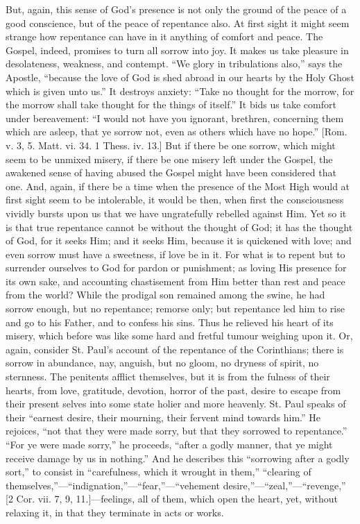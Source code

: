 But, again, this sense of God's presence is not only the ground of
the peace of a good conscience, but of the peace of repentance also.
At first sight it might seem strange how repentance can have in it
anything of comfort and peace. The Gospel, indeed, promises to turn
all sorrow into joy. It makes us take pleasure in desolateness,
weakness, and contempt. ``We glory in tribulations also,''
says the Apostle, ``because the love of God is shed abroad in our
hearts by the Holy Ghost which is given unto us.'' It destroys
anxiety: ``Take no thought for the morrow, for the morrow shall
take thought for the things of itself.'' It bids us take comfort
under bereavement: ``I would not have you ignorant, brethren,
concerning them which are asleep, that ye sorrow not, even as others
which have no hope.'' [Rom. v. 3, 5. Matt. vi. 34. 1 Thess. iv.
13.] But if there be one sorrow, which might seem to be unmixed
misery, if there be one misery left under the Gospel, the awakened
sense of having abused the Gospel might have been considered that one.
And, again, if there be a time when the presence of the Most High
would at first sight seem to be intolerable, it would be then, when
first the consciousness vividly bursts upon us that we have
ungratefully rebelled against Him. Yet so it is that true repentance
cannot be without the thought of God; it has the thought of God, for
it seeks Him; and it seeks Him, because it is quickened with love; and
even sorrow must have a sweetness, if love be in it. For what is to
repent but to surrender ourselves to God for pardon or punishment; as
loving His presence for its own sake, and accounting chastisement from
Him better than rest and peace from the world? While the prodigal son
remained among the swine, he had sorrow enough, but no repentance;
remorse only; but repentance led him to rise and go to his Father, and
to confess his sins. Thus he relieved his heart of its misery, which
before was like some hard and fretful tumour weighing upon it. Or,
again, consider St. Paul's account of the repentance of the
Corinthians; there is sorrow in abundance, nay, anguish, but no gloom,
no dryness of spirit, no sternness. The penitents afflict themselves,
but it is from the fulness of their hearts, from love, gratitude,
devotion, horror of the past, desire to escape from their present
selves into some state holier and more heavenly. St. Paul speaks of
their ``earnest desire, their mourning, their fervent mind towards
him.'' He rejoices, ``not that they were made sorry, but that
they sorrowed to repentance.'' ``For ye were made sorry,''
he proceeds, ``after a godly manner, that ye might receive damage
by us in nothing.'' And he describes this ``sorrowing after a
godly sort,'' to consist in ``carefulness, which it wrought in
them,'' ``clearing of themselves,''—``indignation,''—``fear,''—``vehement
desire,''—``zeal,''—``revenge,'' [2 Cor. vii.
7, 9, 11.]—feelings, all of them, which open the heart, yet, without
relaxing it, in that they terminate in acts or works.

